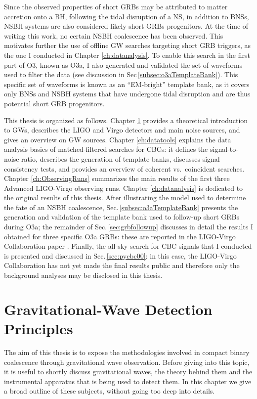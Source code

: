 \documentclass[binding=0.6cm, LaM]{sapthesis}
\begin{document}
	Since the observed properties of short GRBs may be attributed to matter accretion onto a BH,
	following the tidal disruption of a NS, in addition to BNSs, 
	NSBH systems are also considered likely short GRBs progenitors.
	At the time of writing this work, no certain NSBH coalescence has been observed.
	This motivates further the use of 
	offline GW searches targeting short GRB triggers, as the one I conducted in Chapter \ref{ch:datanalysis}.
	To enable this search in the first part of O3, known as O3a, I also generated and validated the set of waveforms 
	used to filter the data (see discussion in Sec\,\ref{subsec:o3aTemplateBank}).
	This specific set of waveforms is known as an ``EM-bright'' template bank, 
	as it covers only BNSs and NSBH systems that have undergone tidal disruption and are thus potential short GRB progenitors.

	This thesis is organized as follows.  
	Chapter \ref{ch:GWDetectionPrinciples} provides a theoretical introduction to GWs,  
	describes the LIGO and Virgo detectors and main noise sources, and gives an overview on GW sources.
	Chapter \ref{ch:datatools} explains the data analysis basics of matched-filtered searches for CBCs: 
	it defines the signal-to-noise ratio, 
	describes the generation of template banks, discusses signal consistency tests, 
	and provides an overview of coherent vs.~coincident searches.
	Chapter \ref{ch:ObservingRuns} summarizes the main results of the first three Advanced LIGO-Virgo observing runs.
	Chapter \ref{ch:datanalysis} is dedicated to the original results of this thesis.  
	After illustrating the model used to determine the fate of an NSBH coalescence, 
	Sec.\,\ref{subsec:o3aTemplateBank} presents the generation and validation of the template bank 
	used to follow-up short GRBs during O3a; 
	the remainder of Sec.\,\ref{sec:grbfollowup} discusses in detail the results I obtained for three specific O3a GRBs: 
	these are reported in the LIGO-Virgo Collaboration paper \cite{43}. 
	Finally, the all-sky search for CBC signals that I conducted is presented and discussed in Sec.\,\ref{sec:pycbc00}: 
	in this case, the LIGO-Virgo Collaboration has not yet made the final results public and 
	therefore only the background analyses may be disclosed in this thesis.

\chapter{Gravitational-Wave Detection Principles}
\label{ch:GWDetectionPrinciples}
	The aim of this thesis is to expose the methodologies involved 
	in compact binary coalescence through gravitational wave observation. 
	Before giving into this topic, it is useful to shortly discuss gravitational waves, 
	the theory behind them and the instrumental apparatus that is being used to detect them. 
	In this chapter we give a broad outline of these subjects, 
	without going too deep into details.
\end{document}
